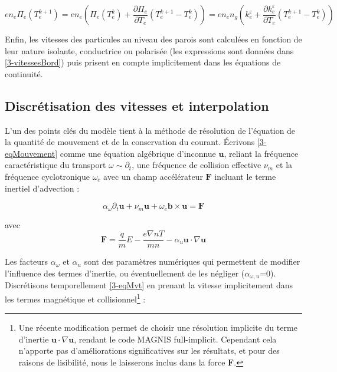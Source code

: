 \begin{refsection}
\begin{equation}
en_e\Pi_e(T_e^{k+1})=en_e\left(\Pi_e(T_e^{k})+\frac{\partial \Pi_e}{\partial
T_e}\left(T_e^{k+1}-T_e^{k}\right)\right)= en_en_g\left(k_e^\varepsilon+
\frac{\partial k_e^\varepsilon}{\partial T_e}(T_e^{k+1}-T_e^{k})\right)
\end{equation}


Enfin, les vitesses des particules au niveau des parois sont calculées en
fonction de leur nature isolante, conductrice ou polarisée (les expressions
sont données dans \ref{3-vitessesBord}) puis prisent en compte implicitement
dans les équations de continuité.

\subsection{Discrétisation des vitesses et interpolation}
L'un des points clés du modèle tient à la méthode de résolution de l'équation de
la quantité de mouvement et de la conservation du courant. Écrivons
\eqref{3-eqMouvement} comme une équation algébrique d'inconnue $\mathbf u$, reliant la fréquence caractéristique du transport
$\omega\sim\partial_t$, une fréquence de collision effective $\nu_m$ et la
fréquence cyclotronique $\omega_c$ avec un champ
accélérateur $\mathbf F$ incluant le terme inertiel d'advection :

\begin{equation}
\label{3-eqMvt}
\alpha_\omega\partial_t \mathbf{u} + 
\nu_m\mathbf{u}+\omega_{c}\mathbf{b}\times\mathbf{u}=
\mathbf F
\end{equation}

avec 
\begin{equation*}\mathbf F=\frac{q}{m}E-\frac{e\nabla
n T}{m
n}-\alpha_u\mathbf{u}\cdot\nabla\mathbf{u}
\end{equation*}

Les facteurs $\alpha_\omega$ et $\alpha_u$ sont des paramètres numériques qui
permettent de modifier l'influence des termes d'inertie, ou éventuellement de
les négliger ($\alpha_{\omega,u}$=0). Discrétisons temporellement
\eqref{3-eqMvt} en prenant la vitesse implicitement dans les termes
magnétique et collisionnel\footnote{Une récente modification permet de choisir
une résolution implicite du terme
d'inertie $\mathbf{u}\cdot\nabla\mathbf{u}$, rendant le code MAGNIS
full-implicit. Cependant cela n'apporte pas d'améliorations significatives sur
les résultats, et pour des raisons de lisibilité, nous le laisserons inclus dans
la force $\mathbf F$.} :


\end{refsection}
